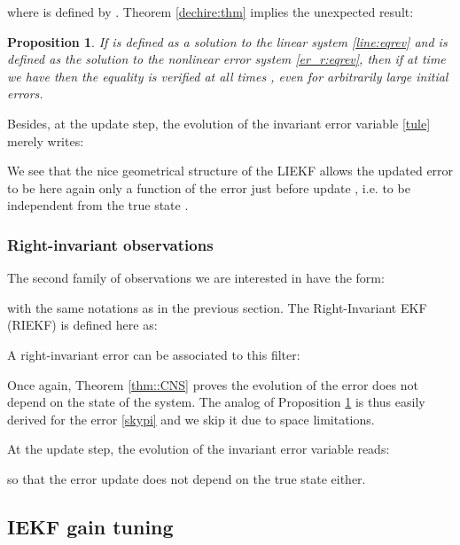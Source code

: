 \documentclass[a4paper,12pt,onecolumn]{article}
\newtheorem{prop}{Proposition}
\begin{document}
where  is defined by . Theorem \ref{dechire:thm} implies the unexpected result:
\begin{prop}\label{mrpror}If  is defined as a solution to the  \emph{linear} system \eqref{line:eqrev} and   is defined as the solution to the \emph{nonlinear} error system \eqref{er_r:eqrev}, then if at time   we have  then the equality  is verified at all times , even for arbitrarily large initial errors.\end{prop}






Besides, at the update step, the evolution of the invariant error variable \eqref{tule} merely writes:

We see that the nice geometrical structure of the LIEKF allows the updated error   to be here again only a function of the error just before update , i.e. to be independent from the true state . 



\subsubsection{Right-invariant observations}
The second family of observations we are interested in have the form:

with the same notations as in the previous section.
The Right-Invariant EKF (RIEKF) is defined here as:

A right-invariant error can be associated to this filter:

Once again,  Theorem \ref{thm::CNS} proves the evolution of the error does not depend on the state of the system. The analog of Proposition \ref{mrpror} is thus easily derived for the error \eqref{skypi} and we skip it due to space limitations.

  
At the update step, the evolution of the invariant error variable reads:

so that the error update does not depend on the true state either. 


\subsection{IEKF gain tuning}\label{ouida}
\end{document}
